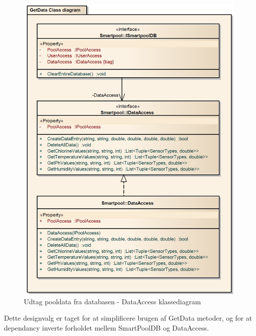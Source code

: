 \begin{figure}[H]
	\centering
	\includegraphics[width=0.6\linewidth]{figs/design/getDataClassDiagramPNG.PNG}
	\caption{Udtag pooldata fra databasen - DataAccess klassediagram}
	\label{fig:getDataClassDiagramPNG}
\end{figure}

Dette designvalg er taget for at simplificere brugen af GetData metoder, og for at dependancy inverte forholdet mellem SmartPoolDB og DataAccess. 





